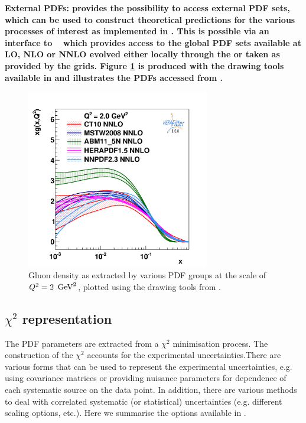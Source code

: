 \begin{description}
%
\item \bf{External PDFs:} \rm 
 \fitter provides the possibility to access external PDF sets, which can be used to construct 
theoretical predictions for the various processes of interest as implemented in \fitter. This is possible via an 
interface to \lhapdf~\cite{lhapdf,lhapdfweb} which provides access to the global PDF sets available at LO, NLO 
or NNLO evolved either locally through the \fitter or taken as provided by the \lhapdf grids. 
Figure \ref{fig:pdfs} is produced with the drawing tools available in \fitter and illustrates 
the PDFs accessed from \lhapdf.
\end{description}
%
\begin{figure}[!ht]
   \centering
   \includegraphics[width=8cm]{pdfs.pdf}
   \caption{Gluon density as extracted by various PDF groups at the scale of $Q^2=2 \ \,\text{Ge\hspace{-.08em}V}^2$, plotted using the drawing tools from \fitter.} 
 \label{fig:pdfs}
\end{figure}
%
\subsection{$\chi^2$ representation}
\label{sec:chi2representation}

The PDF parameters are extracted from a $\chi^2$ minimisation process.
The construction of the  $\chi^2$  accounts for the experimental uncertainties.There are various forms that can be used to represent the experimental uncertainties, e.g. using covariance matrices or providing nuisance parameters for dependence of each systematic source on the data point. 
In addition, there are various methods to deal with correlated systematic (or statistical) uncertainties (e.g. different scaling options, etc.). Here we summarise the options available in \fitter. 

